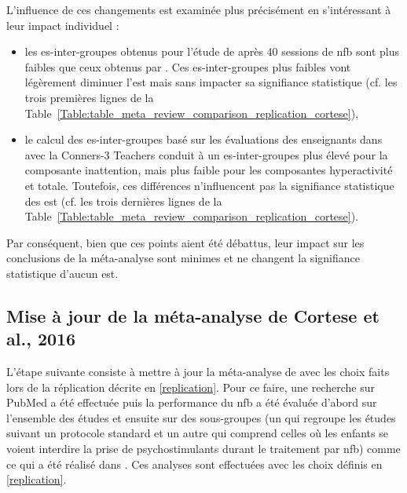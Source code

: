 L'influence de ces changements est examinée plus précisément en s'intéressant à leur impact individuel :
\begin{itemize}
\item les \gls{es}-inter-groupes obtenus pour l'étude de \citet{Arnold2014} après 40 sessions de \gls{nfb} sont plus faibles que ceux obtenus 
par \citet{Cortese2016}. Ces \gls{es}-inter-groupes plus faibles vont légèrement diminuer l'\gls{est} mais sans impacter sa signifiance statistique 
(cf. les trois premières lignes de la Table~\ref{Table:table_meta_review_comparison_replication_cortese}),
\item le calcul des \gls{es}-inter-groupes basé sur les évaluations des enseignants dans \citet{Steiner2014} avec la Conners-3 Teachers
conduit à un \gls{es}-inter-groupes plus élevé pour la composante inattention, mais plus faible pour les composantes hyperactivité et totale. Toutefois, ces
différences n'influencent pas la signifiance statistique des \gls{est} (cf. les trois dernières lignes de la 
Table~\ref{Table:table_meta_review_comparison_replication_cortese}). 
\end{itemize}

Par conséquent, bien que ces points aient été débattus, leur impact sur les conclusions de la méta-analyse sont minimes et ne changent la signifiance statistique 
d'aucun \gls{est}. 

\subsection{Mise à jour de la méta-analyse de Cortese et al., 2016} \label{selection_studies}

L'étape suivante consiste à mettre à jour la méta-analyse de \citet{Cortese2016} avec les choix faits lors de la réplication décrite en \ref{replication}. 
Pour ce faire, une recherche sur PubMed a été effectuée puis la performance du \gls{nfb} a été évaluée d'abord sur l'ensemble des études et ensuite sur 
des sous-groupes (un qui regroupe les études suivant un protocole standard \citep{Arns2014} et un autre qui comprend celles où les enfants se voient interdire la prise
de psychostimulants durant le traitement par \gls{nfb}) comme ce qui a été réalisé dans \citet{Cortese2016}. Ces analyses sont effectuées avec les choix définis en \ref{replication}.

